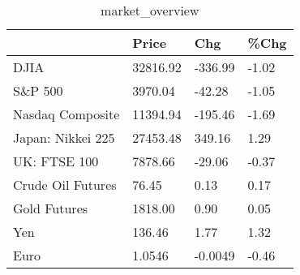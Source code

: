 \documentclass{article}%
\begin{document}
%


\begin{table}[htbp]%
\caption{market\_overview}%
\centering%
\begin{adjustbox}{width=1\textwidth}%
\begin{tabular}{llll}
\toprule
                  &    Price &     Chg &  \%Chg \\
\midrule
             DJIA & 32816.92 & -336.99 & -1.02 \\
          S\&P 500 &  3970.04 &  -42.28 & -1.05 \\
 Nasdaq Composite & 11394.94 & -195.46 & -1.69 \\
Japan: Nikkei 225 & 27453.48 &  349.16 &  1.29 \\
     UK: FTSE 100 &  7878.66 &  -29.06 & -0.37 \\
Crude Oil Futures &    76.45 &    0.13 &  0.17 \\
     Gold Futures &  1818.00 &    0.90 &  0.05 \\
              Yen &   136.46 &    1.77 &  1.32 \\
             Euro &   1.0546 & -0.0049 & -0.46 \\
\bottomrule
\end{tabular}
%
\end{adjustbox}%
\end{table}

%
\end{document}
